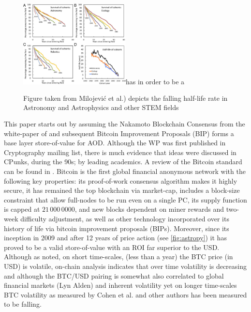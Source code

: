 \documentclass[final,5p,times,twocolumn,authoryear]{elsarticle}
\begin{document}
\begin{figure}[h!]
    \centering
    \label{fig:F4.large}
  \caption{Figure taken from Milojević et al.) depicts the falling half-life rate in Astronomy and Astrophysics and other STEM fields}
  \includegraphics[width=0.5\textwidth]{figs/F4.large.jpg}has in order to be a
\end{figure}
This paper starts out by assuming the Nakamoto Blockchain Consensus from the white-paper of \cite{nak2009} and subsequent Bitcoin Improvement Proposals (BIP) forms a base layer store-of-value for AOD. Although the WP was first published in Cryptography mailing list, there is much evidence that ideas were discussed in CPunks, during the 90s; by leading academics. A review of the Bitcoin standard can be found in \citet{Hansen2020Book}. Bitcoin is the first global financial anonymous network with the following key properties: its proof-of-work consensus algorithm makes it highly secure, it has remained the top blockchain via market-cap, includes a block-size constraint that allow full-nodes to be run even on a single PC, its supply function is capped at $21\,000\,0000$, and new blocks dependent on miner rewards and two-week difficulty adjustment, as well as other technology incorporated over its history of life via bitcoin improvement proposals (BIPs). Moreover, since its inception in 2009 and after 12 years of price action (see \ref{fig:astropy}) it has proved to be a valid store-of-value with an ROI far superior to the USD. Although as noted, on short time-scales, (less than a year) the BTC price (in USD) is volatile, on-chain analysis indicates that over time volatility is decreasing and although the BTC/USD pairing is somewhat also correlated to global financial markets (Lyn Alden) and inherent volatility yet on longer time-scales BTC volatility as measured by Cohen et al. and other authors has been measured to be falling. 
\end{document}
